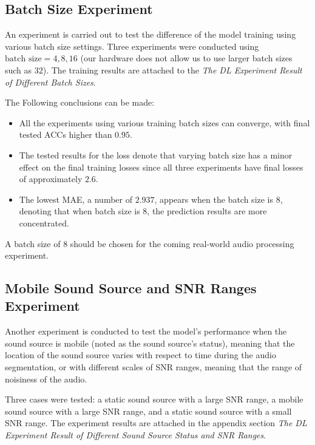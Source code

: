 \subsection*{Batch Size Experiment}
An experiment is carried out to test the difference of the model training using various batch size settings. Three experiments were conducted using \(\text{batch size} = 4,8,16\) (our hardware does not allow us to use larger batch sizes such as \(32\)). The training results are attached to the \textit{The DL Experiment Result of Different Batch Sizes}.

The Following conclusions can be made:
\begin{itemize}
    \item All the experiments using various training batch sizes can converge, with final tested ACCs higher than \(0.95\).
    \item The tested results for the loss denote that varying batch size has a minor effect on the final training losses since all three experiments have final losses of approximately \(2.6\).
    \item The lowest MAE, a number of \(2.937\), appears when the batch size is \(8\), denoting that when batch size is \(8\), the prediction results are more concentrated.
\end{itemize}
A batch size of \(8\) should be chosen for the coming real-world audio processing experiment.

\subsection*{Mobile Sound Source and SNR Ranges Experiment}
Another experiment is conducted to test the model's performance when the sound source is mobile (noted as the sound source's status), meaning that the location of the sound source varies with respect to time during the audio segmentation, or with different scales of SNR ranges, meaning that the range of noisiness of the audio. 

Three cases were tested: a static sound source with a large SNR range, a mobile sound source with a large SNR range, and a static sound source with a small SNR range. The experiment results are attached in the appendix section \textit{The DL Experiment Result of Different Sound Source Status and SNR Ranges}. 

